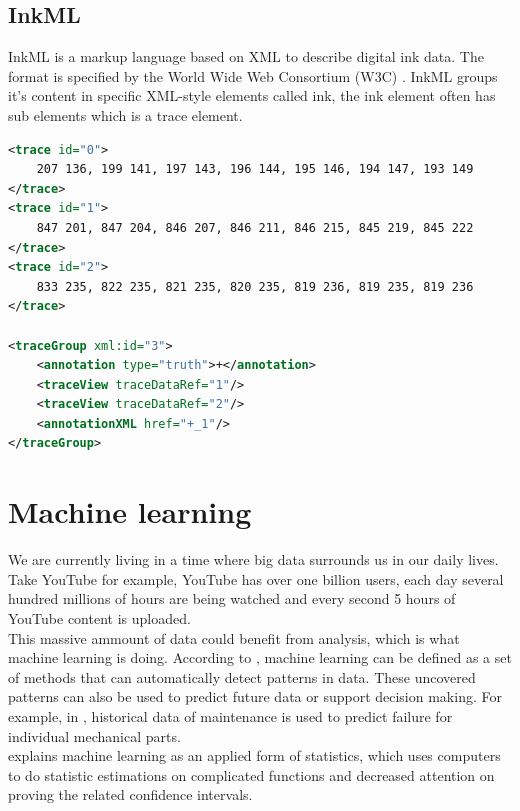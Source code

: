 \subsection{InkML}
InkML is a markup language based on XML to describe digital ink data. The format is specified by the World Wide Web Consortium (W3C) \cite{chee_ink_2011}. InkML groups it's content in specific XML-style elements called ink, the ink element often has sub elements which is a trace element.\\

\begin{minipage}{\linewidth}
\begin{lstlisting}[language=XML, %
label={lst:InkML_ex},
caption={\textbf{\gls{InkML}} example of three traces, each with an file-unique id. In addition to traces, we have listed a tracegroup, which specifies what and where the traces belong to. Truths are used when providing labels to use in supervised learning, which is explained later in this chapter.}]
<trace id="0">
    207 136, 199 141, 197 143, 196 144, 195 146, 194 147, 193 149
</trace>
<trace id="1">
    847 201, 847 204, 846 207, 846 211, 846 215, 845 219, 845 222
</trace>
<trace id="2">
    833 235, 822 235, 821 235, 820 235, 819 236, 819 235, 819 236
</trace>

<traceGroup xml:id="3">
	<annotation type="truth">+</annotation>
	<traceView traceDataRef="1"/>
	<traceView traceDataRef="2"/>
	<annotationXML href="+_1"/>
</traceGroup>
\end{lstlisting}
\end{minipage}

\section{Machine learning}
\label{machine_learning}
% 

We are currently living in a time where big data surrounds us in our daily lives. Take YouTube for example, YouTube has over one billion users, each day several hundred millions of hours are being watched and every second 5 hours of YouTube content is uploaded. \\ %
 This massive ammount of data could benefit from analysis, which is what machine learning is doing. According to \cite{murphy_machine_2012}, machine learning can be defined as a set of methods that can automatically detect patterns in data. These uncovered patterns can also be used to predict future data or support decision making. For example, in \cite{cline_predictive_2017}, historical data of maintenance is used to predict failure for individual mechanical parts. \\
\cite{goodfellow_deep_2016} explains machine learning as an applied form of statistics, which uses computers to do statistic estimations on complicated functions and decreased attention on proving the related confidence intervals. 


